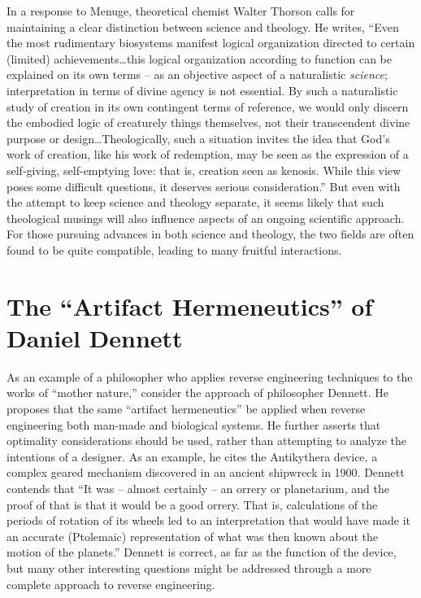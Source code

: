 In a response to Menuge, theoretical chemist Walter Thorson calls for
maintaining a clear distinction between science and theology. He
writes, ``Even the most rudimentary biosystems manifest logical
organization directed to certain (limited) achievements{\ldots}this logical
organization according to function can be explained on its own terms –
as an objective aspect of a naturalistic \textit{science};
interpretation in terms of divine agency is not essential. By such a
naturalistic study of creation in its own contingent terms of
reference, we would only discern the embodied logic of creaturely
things themselves, not their transcendent divine purpose or
design{\ldots}Theologically, such a situation invites the idea that God’s work
of creation, like his work of redemption, may be seen as the expression
of a self-giving, self-emptying love: that is, creation seen as
kenosis. While this view poses some difficult questions, it deserves
serious consideration.''\citep[][pg. 101]{thorson2003} But even with the attempt
to keep science and theology separate, it seems likely that such
theological musings will also influence aspects of an ongoing
scientific approach. For those pursuing advances in both science and
theology, the two fields are often found to be quite compatible,
leading to many fruitful interactions.

\section{The “Artifact Hermeneutics” of Daniel Dennett}

As an example of a philosopher who applies reverse engineering
techniques to the works of “mother nature,” consider the approach of
philosopher Dennett. He proposes that the same “artifact hermeneutics”
be applied when reverse engineering both man-made and biological
systems.\citep[][pg. 177]{dennett1990} He further asserts that optimality
considerations should be used, rather than attempting to analyze the
intentions of a designer. As an example, he cites the Antikythera
device, a complex geared mechanism discovered in an ancient shipwreck
in 1900. Dennett contends that “It was – almost certainly – an orrery
or planetarium, and the proof of that is that it would be a good
orrery. That is, calculations of the periods of rotation of its wheels
led to an interpretation that would have made it an accurate
(Ptolemaic) representation of what was then known about the motion of
the planets.”\citep[][pg. 180]{dennett1990} Dennett is correct, as far as the
function of the device, but many other interesting questions might be
addressed through a more complete approach to reverse engineering.

